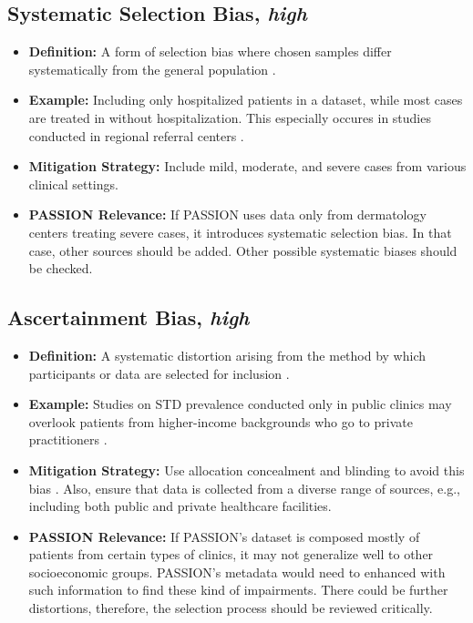 \documentclass[12pt, a4paper, oneside]{book}   	%
\begin{document}
\begin{appendices}
		\subsection{Systematic Selection Bias, \textit{high}}
		\begin{itemize}
			\item \textbf{Definition:} A form of selection bias where chosen samples differ systematically from the general population \autocite{Chakraborty_2024, c5,c6,c33}.
			\item \textbf{Example:} Including only hospitalized patients in a dataset, while most cases are treated in without hospitalization. This especially occures in studies conducted in regional referral centers \autocite{Chakraborty_2024, c5,c6,c33}.
			\item \textbf{Mitigation Strategy:} Include mild, moderate, and severe cases from various clinical settings.
			\item \textbf{PASSION Relevance:} If PASSION uses data only from dermatology centers treating severe cases, it introduces systematic selection bias. In that case, other sources should be added.
			Other possible systematic biases should be checked.
		\end{itemize}
		
		\subsection{Ascertainment Bias, \textit{high}}
		\begin{itemize}
			\item \textbf{Definition:} A systematic distortion arising from the method by which participants or data are selected for inclusion \autocite{Chakraborty_2024, c5}.
			\item \textbf{Example:} Studies on STD prevalence conducted only in public clinics may overlook patients from higher-income backgrounds who go to private practitioners \autocite{Chakraborty_2024, c5}.
			\item \textbf{Mitigation Strategy:} Use allocation concealment and blinding to avoid this bias \autocite{Chakraborty_2024, c5}.
			Also, ensure that data is collected from a diverse range of sources, e.g., including both public and private healthcare facilities.
			\item \textbf{PASSION Relevance:} If PASSION’s dataset is composed mostly of patients from certain types of clinics, it may not generalize well to other socioeconomic groups. PASSION's metadata would need to enhanced with such information to find these kind of impairments. There could be further distortions, therefore, the selection process should be reviewed critically.
		\end{itemize}
		

\end{appendices}
\end{document}
